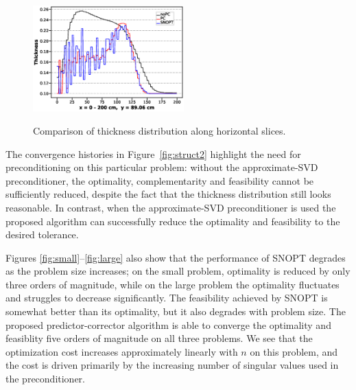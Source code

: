 \begin{figure}[tbp]
{   \includegraphics[clip,width=0.52\textwidth]{./figs/chap6_fstopo/29.eps} }
    \caption{Comparison of thickness distribution along horizontal slices. \label{fig:fs_slices}}
\end{figure}



The convergence histories in Figure~\ref{fig:struct2} highlight the need for preconditioning
on this particular problem: without the approximate-SVD preconditioner, the optimality, complementarity and 
feasibility cannot be sufficiently reduced, despite the fact that the thickness distribution 
still looks reasonable. 
In contrast, when the approximate-SVD preconditioner is used the
proposed algorithm can successfully reduce the optimality 
and feasibility to the desired tolerance.

Figures \ref{fig:small}--\ref{fig:large} also show that the performance of SNOPT
degrades as the problem size increases; on the small problem, optimality is
reduced by only three orders of magnitude, while on the large problem the optimality
fluctuates and struggles to decrease significantly. The feasibility achieved by SNOPT is somewhat better
than its optimality, but it also degrades with problem size.  The proposed
predictor-corrector algorithm is able to converge the optimality and feasiblity
five orders of magnitude on all three problems. We see that the
optimization cost increases approximately linearly with $n$ on this
problem, and the cost is driven primarily by the increasing number of singular values used
in the preconditioner. 

